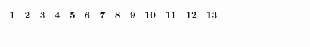 
{\ttfamily
\begin{tabular}{|c|c|c|c|c|c|c|c|c|c|c|c|c|}\hline
  1 & 2 & 3 & 4 & 5 & 6 & 7 & 8 & 9 & 10 & 11 & 12 & 13 \\\hline
\end{tabular}
}


\hrule
\vspace{1em}
\hrule
